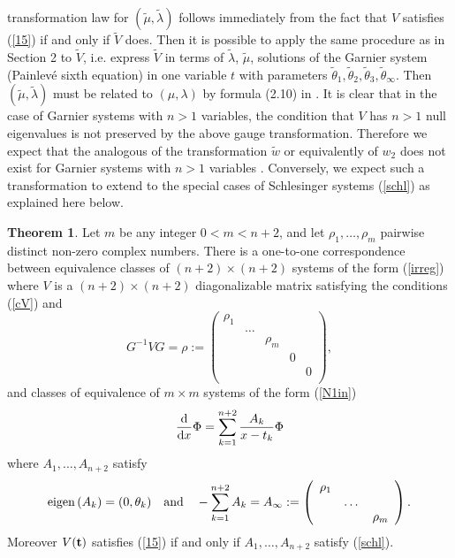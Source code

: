 \documentclass[12pt]{article}
\theoremstyle{definition}
\theoremstyle{theorem}
\newtheorem{thm}[df]{Theorem}
\begin{document}
transformation law for $(\tilde\mu,\tilde\lambda)$ follows immediately from 
the fact that $V$ satisfies (\ref{15}) if and only if $\tilde V$ does. Then
it is possible to apply the same procedure as in Section 2 to $\tilde V$, i.e.
express $\tilde V$ in terms of $\tilde\lambda$, $\tilde\mu$, solutions of the
Garnier system (Painlev\'e sixth equation) in one variable $t$ with parameters
$\tilde\theta_1,\tilde\theta_2,\tilde\theta_3,\tilde\theta_\infty$. Then
$(\tilde\mu,\tilde\lambda)$ must be related to $(\mu,\lambda)$ by formula 
(2.10) in \cite{Ok2}.
It is clear that in the case of Garnier systems with $n>1$ variables,
the condition that $V$ has $n>1$ null eigenvalues is not 
preserved by the above gauge transformation. Therefore we expect that
the analogous of the transformation $\tilde w$ or equivalently of $w_2$ does 
not exist for Garnier systems with $n>1$ variables \cite{ST}. Conversely, we
expect such a transformation to extend to the special cases of Schlesinger 
systems (\ref{schl}) as explained here below.

\begin{thm}
Let $m$ be any integer $0<m<n+2$, and let $\rho_1,\dots,\rho_{m}$ pairwise 
distinct non-zero complex numbers. There is a one-to-one correspondence 
between equivalence classes of $(n+2)\times(n+2)$ systems of the form 
(\ref{irreg}) where $V$ is a $(n+2)\times(n+2)$ diagonalizable matrix 
satisfying the conditions (\ref{cV}) and 
\begin{equation}
G^{-1}VG = \rho:=\left(\begin{array}{ccccc}
\rho_1& & & &\\
&\dots & & &\\ & & \rho_m & &\\ & &  & 0  & \\ & & & & 0\\
\end{array}\right),
\label{cV2}\end{equation}
and classes of equivalence of $m\times m$ systems of the form (\ref{N1in})
$$
{{\rm d}\over{\rm d} x} \Phi
=\sum_{k=1}^{n+2} {{A}_k\over x-t_k}\Phi 
$$
where $A_1,\dots,A_{n+2}$ satisfy 
\begin{equation}
{\rm eigen}\left({A}_k\right)=(0,{\theta_k})
\quad\hbox{and}\quad
-\sum_{k=1}^{n+2}{A}_k={A}_\infty:=\left(
\begin{array}{ccc}
\rho_1 & & \\ & \dots & \\ & & \rho_{m} 
\end{array}\right).
\label{new}\end{equation}
Moreover $V({\bf t})$ satisfies (\ref{15}) if and only if $A_1,\dots,A_{n+2}$ 
satisfy (\ref{schl}).
\end{thm}
\end{document}

